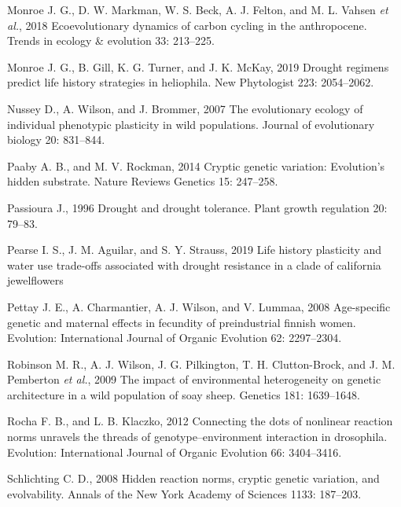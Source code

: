 \documentclass[jou,floatsintext]{apa6}
\begin{document}
\leavevmode\hypertarget{ref-monroe2018ecoevolutionary}{}%
Monroe J. G., D. W. Markman, W. S. Beck, A. J. Felton, and M. L. Vahsen \emph{et al.}, 2018 Ecoevolutionary dynamics of carbon cycling in the anthropocene. Trends in ecology \& evolution 33: 213--225.

\leavevmode\hypertarget{ref-monroe2019drought}{}%
Monroe J. G., B. Gill, K. G. Turner, and J. K. McKay, 2019 Drought regimens predict life history strategies in heliophila. New Phytologist 223: 2054--2062.

\leavevmode\hypertarget{ref-nussey2007evolutionary}{}%
Nussey D., A. Wilson, and J. Brommer, 2007 The evolutionary ecology of individual phenotypic plasticity in wild populations. Journal of evolutionary biology 20: 831--844.

\leavevmode\hypertarget{ref-paaby2014cryptic}{}%
Paaby A. B., and M. V. Rockman, 2014 Cryptic genetic variation: Evolution's hidden substrate. Nature Reviews Genetics 15: 247--258.

\leavevmode\hypertarget{ref-passioura1996drought}{}%
Passioura J., 1996 Drought and drought tolerance. Plant growth regulation 20: 79--83.

\leavevmode\hypertarget{ref-pearse2019life}{}%
Pearse I. S., J. M. Aguilar, and S. Y. Strauss, 2019 Life history plasticity and water use trade-offs associated with drought resistance in a clade of california jewelflowers

\leavevmode\hypertarget{ref-pettay2008age}{}%
Pettay J. E., A. Charmantier, A. J. Wilson, and V. Lummaa, 2008 Age-specific genetic and maternal effects in fecundity of preindustrial finnish women. Evolution: International Journal of Organic Evolution 62: 2297--2304.

\leavevmode\hypertarget{ref-robinson2009impact}{}%
Robinson M. R., A. J. Wilson, J. G. Pilkington, T. H. Clutton-Brock, and J. M. Pemberton \emph{et al.}, 2009 The impact of environmental heterogeneity on genetic architecture in a wild population of soay sheep. Genetics 181: 1639--1648.

\leavevmode\hypertarget{ref-rocha2012connecting}{}%
Rocha F. B., and L. B. Klaczko, 2012 Connecting the dots of nonlinear reaction norms unravels the threads of genotype--environment interaction in drosophila. Evolution: International Journal of Organic Evolution 66: 3404--3416.

\leavevmode\hypertarget{ref-schlichting2008hidden}{}%
Schlichting C. D., 2008 Hidden reaction norms, cryptic genetic variation, and evolvability. Annals of the New York Academy of Sciences 1133: 187--203.
\end{document}
